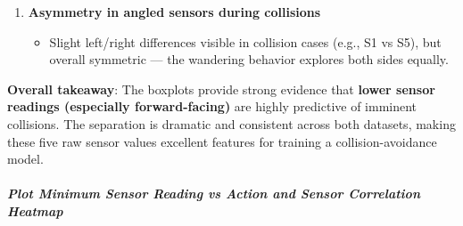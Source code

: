 \begin{enumerate}
\item \textbf{Asymmetry in angled sensors during collisions}

\begin{itemize}
\item Slight left/right differences visible in collision cases (e.g., S1 vs S5), but overall symmetric --- the wandering behavior explores both sides equally.
\end{itemize}
\end{enumerate}

\textbf{Overall takeaway}:\newline
The boxplots provide strong evidence that \textbf{lower sensor readings (especially forward-facing)} are highly predictive of imminent collisions. The separation is dramatic and consistent across both datasets, making these five raw sensor values excellent features for training a collision-avoidance model.

\subparagraph{Plot Minimum Sensor Reading vs Action and Sensor Correlation Heatmap}

